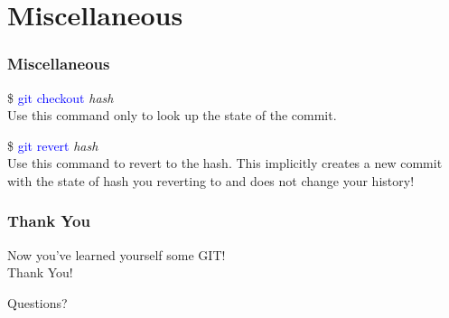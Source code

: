 \documentclass[aspectratio=169]{beamer}
\begin{document}
\section{Miscellaneous}
\begin{frame}

\frametitle{Miscellaneous}

\$ \textcolor{blue}{git checkout} \textit{hash}\\
Use this command only to look up the state of the commit.

\$ \textcolor{blue}{git revert} \textit{hash}\\
Use this command to revert to the hash. This implicitly creates a new commit with the state of hash you reverting to and does not change your history!

\end{frame}

\begin{frame}

\frametitle{Thank You}

\begin{center}
Now you've learned yourself some GIT!\\
Thank You!

Questions?
\end{center}

\end{frame}

\end{document}
